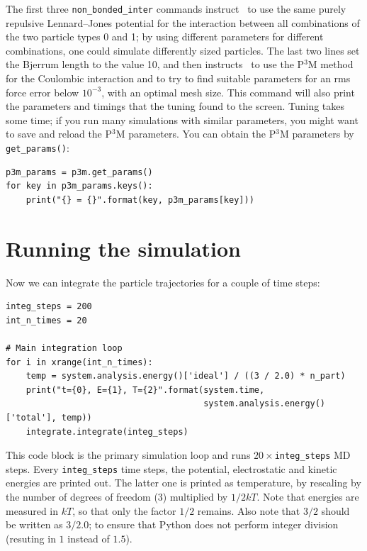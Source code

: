 \documentclass[
a4paper,                        %
11pt,                           %
twoside,                        %
footsepline,                    %
headsepline,                    %
headexclude,                    %
footexclude,                    %
pagesize,                       %
]{scrartcl}
\begin{document}
The first three \verb|non_bonded_inter| commands instruct \es\ to use the same
purely repulsive Lennard--Jones potential for the interaction between
all combinations of the two particle types 0 and 1; by using different
parameters for different combinations, one could simulate differently
sized particles.  The last two lines set the Bjerrum length to the value
10, and then instructs \es\ to use the P$^3$M method for the Coulombic
interaction and to try to find suitable parameters for an rms force
error below $10^{-3}$, with an optimal mesh size. This command will also print 
the parameters and timings that the tuning found to the screen. Tuning takes 
some time; if you run many simulations with similar parameters, you might want 
to save and reload
the P$^3$M parameters. You can obtain the P$^3$M parameters by
\verb|get_params()|:

\begin{lstlisting}
p3m_params = p3m.get_params()
for key in p3m_params.keys():
    print("{} = {}".format(key, p3m_params[key]))
\end{lstlisting}


\section{Running the simulation}

Now we can integrate the particle trajectories for a couple of time
steps:

\begin{lstlisting}
integ_steps = 200
int_n_times = 20

# Main integration loop
for i in xrange(int_n_times):
    temp = system.analysis.energy()['ideal'] / ((3 / 2.0) * n_part)
    print("t={0}, E={1}, T={2}".format(system.time,
                                       system.analysis.energy()['total'], temp))
    integrate.integrate(integ_steps)
\end{lstlisting}

This code block is the primary simulation loop and runs
$20\times$\verb|integ_steps| MD steps. Every \verb|integ_steps| time
steps, the potential, electrostatic and kinetic energies are printed
out. The latter one is printed as temperature, by rescaling by the
number of degrees of freedom (3) multiplied by $1/2kT$. Note that
energies are measured in $kT$, so that only the factor $1/2$
remains. Also note that $3/2$ should be written as $3/2.0$; to ensure
that Python does not perform integer division (resuting in $1$ instead of
$1.5$).
\end{document}
